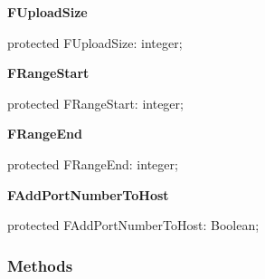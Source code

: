 \documentclass{report}
\newif\ifpdf
\begin{document}
\begin{list}{}
\begin{flushleft}
\ifpdf
\end{flushleft}
\fi


\par  \label{httpsend.THTTPSend-FUploadSize}
\item[\textbf{FUploadSize}\hfill]
\ifpdf
\begin{flushleft}
\fi
\begin{ttfamily}
protected FUploadSize: integer;\end{ttfamily}

\ifpdf
\end{flushleft}
\fi


\par  \label{httpsend.THTTPSend-FRangeStart}
\item[\textbf{FRangeStart}\hfill]
\ifpdf
\begin{flushleft}
\fi
\begin{ttfamily}
protected FRangeStart: integer;\end{ttfamily}

\ifpdf
\end{flushleft}
\fi


\par  \label{httpsend.THTTPSend-FRangeEnd}
\item[\textbf{FRangeEnd}\hfill]
\ifpdf
\begin{flushleft}
\fi
\begin{ttfamily}
protected FRangeEnd: integer;\end{ttfamily}

\ifpdf
\end{flushleft}
\fi


\par  \label{httpsend.THTTPSend-FAddPortNumberToHost}
\item[\textbf{FAddPortNumberToHost}\hfill]
\ifpdf
\begin{flushleft}
\fi
\begin{ttfamily}
protected FAddPortNumberToHost: Boolean;\end{ttfamily}

\ifpdf
\end{flushleft}
\fi


\par  \end{list}
\subsubsection*{\large{\textbf{Methods}}\normalsize\hspace{1ex}\hfill}
\end{document}
